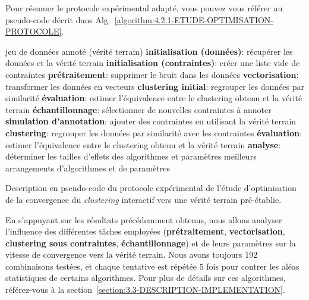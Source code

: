 			Pour résumer le protocole expérimental adapté, vous pouvez vous référer au pseudo-code décrit dans Alg.~\ref{algorithm:4.2.1-ETUDE-OPTIMISATION-PROTOCOLE}.
			\begin{algorithm}[!htb]
				\begin{algorithmic}[1]
					\Require jeu de données annoté (vérité terrain)
						\State \textbf{initialisation (données)}: récupérer les données et la vérité terrain
						\State \textbf{initialisation (contraintes)}: créer une liste vide de contraintes
						\State \textbf{prétraitement}: supprimer le bruit dans les données
						\State \textbf{vectorisation}: transformer les données en vecteurs
						\State \textbf{clustering initial}: regrouper les données par similarité
						\State \textbf{évaluation}: estimer l'équivalence entre le clustering obtenu et la vérité terrain
						\Repeat
							\State \textbf{échantillonnage}: sélectionner de nouvelles contraintes à annoter
							\State \textbf{simulation d'annotation}: ajouter des contraintes en utilisant la vérité terrain
							\State \textbf{clustering}: regrouper les données par similarité avec les contraintes
							\State \textbf{évaluation}: estimer l'équivalence entre le clustering obtenu et la vérité terrain
					\EndFor
					\State \textbf{analyse}: déterminer les tailles d'effets des algorithmes et paramètres
					\Ensure meilleurs arrangements d'algorithmes et de paramètres
				\end{algorithmic}
				\caption{Description en pseudo-code du protocole expérimental de l'étude d'optimisation de la convergence du \textit{clustering} interactif vers une vérité terrain pré-établie.}
				\label{algorithm:4.2.1-ETUDE-OPTIMISATION-PROTOCOLE}
			\end{algorithm}
			
			En s'appuyant sur les résultats précédemment obtenus, nous allons analyser l'influence des différentes tâches employées (\textbf{prétraitement}, \textbf{vectorisation}, \textbf{clustering sous contraintes}, \textbf{échantillonnage}) et de leurs paramètres sur la vitesse de convergence vers la vérité terrain.
			Nous avons toujours $192$ combinaisons testées, et chaque tentative est répétée $5$ fois pour contrer les aléas statistiques de certains algorithmes.
			Pour plus de détails sur ces algorithmes, référez-vous à la section~\ref{section:3.3-DESCRIPTION-IMPLEMENTATION}.
			

